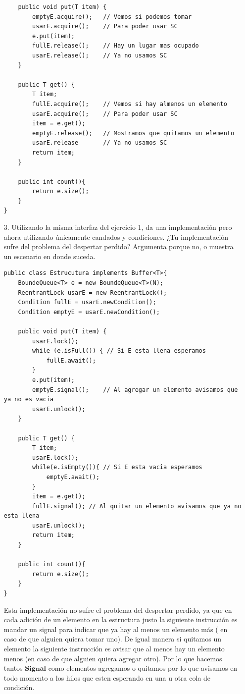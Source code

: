 \documentclass[12pt, letterpaper]{article}
\begin{document}
\begin{itemize}
\begin{lstlisting}
    public void put(T item) {
        emptyE.acquire();   // Vemos si podemos tomar
        usarE.acquire();    // Para poder usar SC
        e.put(item);    
        fullE.release();    // Hay un lugar mas ocupado
        usarE.release();    // Ya no usamos SC
    }

    public T get() {
        T item;
        fullE.acquire();    // Vemos si hay almenos un elemento
        usarE.acquire();    // Para poder usar SC
        item = e.get();  
        emptyE.release();   // Mostramos que quitamos un elemento
        usarE.release       // Ya no usamos SC
        return item;
    }

    public int count(){
        return e.size();
    }
}
\end{lstlisting}



\item[3. ]Utilizando la misma interfaz del ejercicio 1, da una implementación pero ahora
utilizando únicamente candados y condiciones. ¿Tu implementación sufre del
problema del despertar perdido? Argumenta porque no, o muestra un escenario
en donde suceda.

\begin{lstlisting}
public class Estrucutura implements Buffer<T>{
    BoundeQueue<T> e = new BoundeQueue<T>(N);
    ReentrantLock usarE = new ReentrantLock();
    Condition fullE = usarE.newCondition(); 
    Condition emptyE = usarE.newCondition();

    public void put(T item) {
        usarE.lock();
        while (e.isFull()) { // Si E esta llena esperamos
            fullE.await();
        }
        e.put(item); 
        emptyE.signal();	// Al agregar un elemento avisamos que ya no es vacia
        usarE.unlock();
    }

    public T get() {
        T item;
        usarE.lock();
        while(e.isEmpty()){	// Si E esta vacia esperamos
            emptyE.await();
        }
        item = e.get();
        fullE.signal();	// Al quitar un elemento avisamos que ya no esta llena
        usarE.unlock();
        return item;
    }

    public int count(){
        return e.size();
    }
}
\end{lstlisting}

Esta implementación no sufre el problema del despertar perdido, ya que en cada adición de un elemento en la estructura justo la siguiente instrucción es mandar un signal para indicar que ya hay al menos un elemento más ( en caso de que alguien quiera tomar uno). De igual manera si quitamos un elemento la siguiente instrucción es avisar que al menos hay un elemento menos (en caso de que alguien quiera agregar otro). Por lo que hacemos tantos $\textbf{Signal}$ como elementos agregamos o quitamos por lo que avisamos en todo momento a los hilos que esten esperando en una u otra cola de condición.


\end{itemize}
\end{document}

